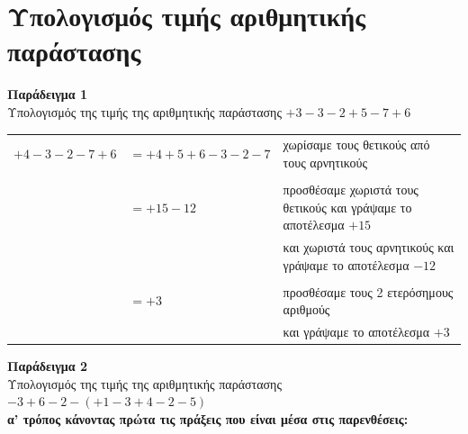 \documentclass[a4paper,10pt]{report}
\begin{document}
\section*{Υπολογισμός τιμής αριθμητικής παράστασης\hfill \small{}}

\textbf{Παράδειγμα 1} \\
Υπολογισμός της τιμής της αριθμητικής παράστασης  $+3-3-2+5-7+6$

\begin{table}[h]
\begin{tabular}{ll|l}
$+4-3-2-7+6$ & $= +4+5+6-3-2-7$ & χωρίσαμε τους θετικούς από τους αρνητικούς                       \\
             &                  &                                                                  \\
             & $= +15-12$       & προσθέσαμε χωριστά τους θετικούς και γράψαμε το αποτέλεσμα $+15$ \\
             &                  & και χωριστά τους αρνητικούς και γράψαμε το αποτέλεσμα $-12$      \\
             &                  &                                                                  \\
             & $= +3$           & προσθέσαμε τους 2 ετερόσημους αριθμούς                           \\
             &                  & και γράψαμε το αποτέλεσμα $+3$                                  
\end{tabular}
\end{table}


\textbf{Παράδειγμα 2} \\
Υπολογισμός της τιμής της αριθμητικής παράστασης  $-3+6-2-(+1-3+4-2-5)$ \\


\textbf{α' τρόπος κάνοντας πρώτα τις πράξεις που είναι μέσα στις παρενθέσεις:} 
\end{document}
